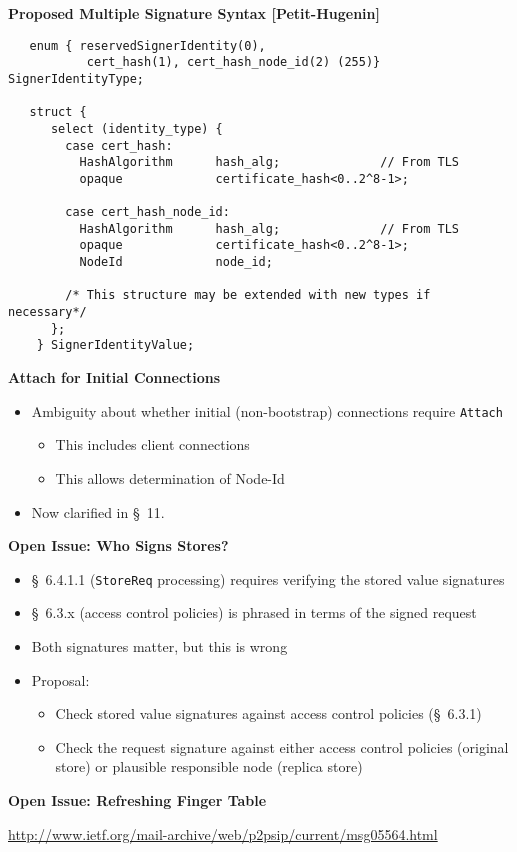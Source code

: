 \documentclass[helvetica]{seminar}
\newcommand{\heading}[1]{%
  \begin{center} 
    \large\bf 
    #1 
  \end{center} 
  \vspace{.4 in}}
\begin{document}
\begin{slide}
\heading{Proposed Multiple Signature Syntax [Petit-Hugenin]}

\vspace{-.2in}
\footnotesize{
\begin{verbatim}
   enum { reservedSignerIdentity(0),
           cert_hash(1), cert_hash_node_id(2) (255)} SignerIdentityType;

   struct {
      select (identity_type) {
        case cert_hash:
          HashAlgorithm      hash_alg;              // From TLS
          opaque             certificate_hash<0..2^8-1>;

        case cert_hash_node_id:
          HashAlgorithm      hash_alg;              // From TLS
          opaque             certificate_hash<0..2^8-1>;
          NodeId             node_id;

        /* This structure may be extended with new types if necessary*/
      };
    } SignerIdentityValue;
\end{verbatim}
}
\end{slide}

\begin{slide}
\heading{Attach for Initial Connections}

\begin{itemize}
\item Ambiguity about whether initial (non-bootstrap) connections require \verb^Attach^
  \begin{itemize}
  \item This includes client connections
  \item This allows determination of Node-Id
  \end{itemize}
\item Now clarified in \S\ 11.
\end{itemize}
\end{slide}


\begin{slide}
\heading{Open Issue: Who Signs Stores?}

\begin{itemize}
\item \S\ 6.4.1.1 (\verb^StoreReq^ processing) requires verifying the stored value signatures
\item \S\ 6.3.x (access control policies) is phrased in terms of the signed request

\item Both signatures matter, but this is wrong
\item Proposal:
  \begin{itemize}
  \item Check stored value signatures against access control policies (\S\ 6.3.1)
  \item Check the request signature against either access control policies (original store) or plausible responsible node (replica store)
  \end{itemize}
\end{itemize}
\end{slide}



\begin{slide}
\heading{Open Issue: Refreshing Finger Table}

\url{http://www.ietf.org/mail-archive/web/p2psip/current/msg05564.html}

\end{slide}
\end{document}
